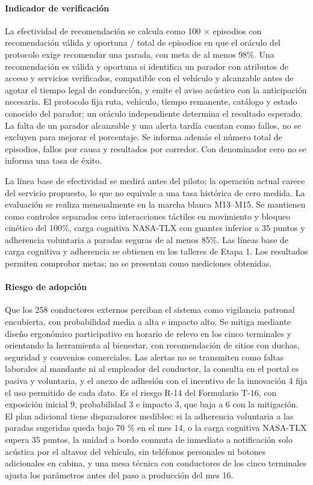 \paragraph{Indicador de verificación} La efectividad de recomendación se calcula como 100 × episodios con recomendación válida y oportuna / total de episodios en que el oráculo del protocolo exige recomendar una parada, con meta de al menos 98\%. Una recomendación es válida y oportuna si identifica un parador con atributos de acceso y servicios verificados, compatible con el vehículo y alcanzable antes de agotar el tiempo legal de conducción, y emite el aviso acústico con la anticipación necesaria. El protocolo fija ruta, vehículo, tiempo remanente, catálogo y estado conocido del parador; un oráculo independiente determina el resultado esperado. La falta de un parador alcanzable y una alerta tardía cuentan como fallos, no se excluyen para mejorar el porcentaje. Se informa además el número total de episodios, fallos por causa y resultados por corredor. Con denominador cero no se informa una tasa de éxito.

La línea base de efectividad se medirá antes del piloto; la operación actual carece del servicio propuesto, lo que no equivale a una tasa histórica de cero medida. La evaluación se realiza mensualmente en la marcha blanca M13--M15. Se mantienen como controles separados cero interacciones táctiles en movimiento y bloqueo cinético del 100\%, carga cognitiva NASA-TLX con guantes inferior a 35 puntos y adherencia voluntaria a paradas seguras de al menos 85\%. Las líneas base de carga cognitiva y adherencia se obtienen en los talleres de Etapa 1. Los resultados permiten comprobar metas; no se presentan como mediciones obtenidas.

\paragraph{Riesgo de adopción} Que los 258 conductores externos perciban el sistema como vigilancia
patronal encubierta, con probabilidad media a alta e impacto alto. Se mitiga mediante diseño
ergonómico participativo en horario de relevo en los cinco terminales y orientando la herramienta al
bienestar, con recomendación de sitios con duchas, seguridad y convenios comerciales. Las alertas no
se transmiten como faltas laborales al mandante ni al empleador del conductor, la consulta en el
portal es pasiva y voluntaria, y el anexo de adhesión con el incentivo de la innovación 4 fija el uso
permitido de cada dato. Es el riesgo R-14 del Formulario T-16, con exposición inicial 9, probabilidad 3
e impacto 3, que baja a 6 con la mitigación. El plan adicional tiene disparadores medibles: si la
adherencia voluntaria a las paradas sugeridas queda bajo 70 \% en el mes 14, o la carga cognitiva
NASA-TLX supera 35 puntos, la unidad a bordo conmuta de inmediato a notificación solo acústica por el
altavoz del vehículo, sin teléfonos personales ni botones adicionales en cabina, y una mesa técnica
con conductores de los cinco terminales ajusta los parámetros antes del paso a producción del mes 16.
